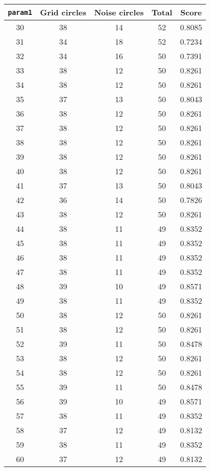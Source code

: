 \documentclass[letterpaper, 12pt]{article}
\begin{document}
\begin{longtable}{|c|c|c|c|c|}
\hline
\textbf{\texttt{param1}} & \textbf{Grid circles} & \textbf{Noise circles} & \textbf{Total} & \textbf{Score} \\
\hline
30 & 38 & 14 & 52 & 0.8085 \\
\hline
31 & 34 & 18 & 52 & 0.7234 \\
\hline
32 & 34 & 16 & 50 & 0.7391 \\
\hline
33 & 38 & 12 & 50 & 0.8261 \\
\hline
34 & 38 & 12 & 50 & 0.8261 \\
\hline
35 & 37 & 13 & 50 & 0.8043 \\
\hline
36 & 38 & 12 & 50 & 0.8261 \\
\hline
37 & 38 & 12 & 50 & 0.8261 \\
\hline
38 & 38 & 12 & 50 & 0.8261 \\
\hline
39 & 38 & 12 & 50 & 0.8261 \\
\hline
40 & 38 & 12 & 50 & 0.8261 \\
\hline
41 & 37 & 13 & 50 & 0.8043 \\
\hline
42 & 36 & 14 & 50 & 0.7826 \\
\hline
43 & 38 & 12 & 50 & 0.8261 \\
\hline
44 & 38 & 11 & 49 & 0.8352 \\
\hline
45 & 38 & 11 & 49 & 0.8352 \\
\hline
46 & 38 & 11 & 49 & 0.8352 \\
\hline
47 & 38 & 11 & 49 & 0.8352 \\
\hline
48 & 39 & 10 & 49 & 0.8571 \\
\hline
49 & 38 & 11 & 49 & 0.8352 \\
\hline
50 & 38 & 12 & 50 & 0.8261 \\
\hline
51 & 38 & 12 & 50 & 0.8261 \\
\hline
52 & 39 & 11 & 50 & 0.8478 \\
\hline
53 & 38 & 12 & 50 & 0.8261 \\
\hline
54 & 38 & 12 & 50 & 0.8261 \\
\hline
55 & 39 & 11 & 50 & 0.8478 \\
\hline
56 & 39 & 10 & 49 & 0.8571 \\
\hline
57 & 38 & 11 & 49 & 0.8352 \\
\hline
58 & 37 & 12 & 49 & 0.8132 \\
\hline
59 & 38 & 11 & 49 & 0.8352 \\
\hline
60 & 37 & 12 & 49 & 0.8132 \\

\end{longtable}
\end{document}
